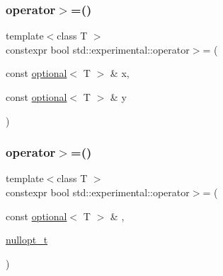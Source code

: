 \subsubsection{\texorpdfstring{operator$>$=()}{operator>=()}\hspace{0.1cm}{\footnotesize\ttfamily [1/9]}}
{\footnotesize\ttfamily template$<$class T $>$ \\
constexpr bool std\+::experimental\+::operator$>$= (\begin{DoxyParamCaption}\item[{const \mbox{\hyperlink{classstd_1_1experimental_1_1optional}{optional}}$<$ T $>$ \&}]{x,  }\item[{const \mbox{\hyperlink{classstd_1_1experimental_1_1optional}{optional}}$<$ T $>$ \&}]{y }\end{DoxyParamCaption})}

\mbox{\label{namespacestd_1_1experimental_a35cdc6a5b56b8db5690f4035242332a0}} 
\subsubsection{\texorpdfstring{operator$>$=()}{operator>=()}\hspace{0.1cm}{\footnotesize\ttfamily [2/9]}}
{\footnotesize\ttfamily template$<$class T $>$ \\
constexpr bool std\+::experimental\+::operator$>$= (\begin{DoxyParamCaption}\item[{const \mbox{\hyperlink{classstd_1_1experimental_1_1optional}{optional}}$<$ T $>$ \&}]{,  }\item[{\mbox{\hyperlink{structstd_1_1experimental_1_1nullopt__t}{nullopt\+\_\+t}}}]{ }\end{DoxyParamCaption})\hspace{0.3cm}{\ttfamily [noexcept]}}

\mbox{\label{namespacestd_1_1experimental_aec1ef0d119fb9270b05212cea79a0fe0}} 
